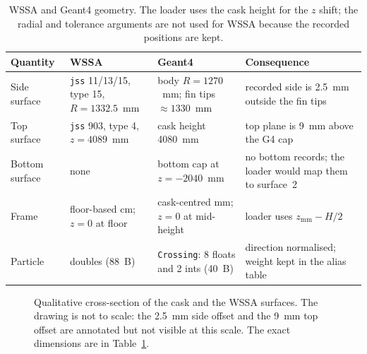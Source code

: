\documentclass[11pt,a4paper]{article}
\begin{document}
\begin{table}[t]
\centering
\caption{WSSA and Geant4 geometry.  The loader uses the cask height for the
$z$ shift; the radial and tolerance arguments are not used for WSSA because the
recorded positions are kept.}
\label{tab:geometry}
\footnotesize
\begin{tabular}{@{}>{\raggedright\arraybackslash}p{2.4cm}
                  >{\raggedright\arraybackslash}p{4.3cm}
                  >{\raggedright\arraybackslash}p{3.8cm}
                  >{\raggedright\arraybackslash}p{4.8cm}@{}}
\toprule
Quantity & WSSA & Geant4 & Consequence \\
\midrule
Side surface & \texttt{jss} 11/13/15, type 15, $R=1332.5$~mm
             & body $R=1270$~mm; fin tips $\approx1330$~mm
             & recorded side is 2.5~mm outside the fin tips \\
Top surface  & \texttt{jss} 903, type 4, $z=4089$~mm
             & cask height 4080~mm
             & top plane is 9~mm above the G4 cap \\
Bottom surface & none & bottom cap at $z=-2040$~mm
             & no bottom records; the loader would map them to surface~2 \\
Frame        & floor-based cm; $z=0$ at floor
             & cask-centred mm; $z=0$ at mid-height
             & loader uses $z_{\mathrm{mm}}-H/2$ \\
Particle     & 11 doubles (88~B)
             & \texttt{Crossing}: 8 floats and 2 ints (40~B)
             & direction normalised; weight kept in the alias table \\
\bottomrule
\end{tabular}
\end{table}

\begin{figure}[t]
\centering
{}
\caption{Qualitative cross-section of the cask and the WSSA surfaces.  The
drawing is not to scale: the 2.5~mm side offset and the 9~mm top offset are
annotated but not visible at this scale.  The exact dimensions are in
Table~\ref{tab:geometry}.}
\label{fig:geometry}
\end{figure}
\end{document}
